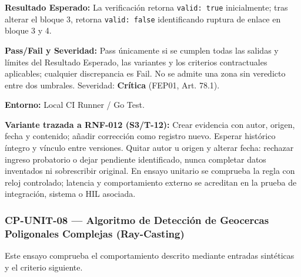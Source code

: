 \par\noindent\textbf{Resultado Esperado:} La verificación retorna \texttt{v\allowbreak{}a\allowbreak{}l\allowbreak{}i\allowbreak{}d\allowbreak{}:\allowbreak{} t\allowbreak{}r\allowbreak{}u\allowbreak{}e\allowbreak{}} inicialmente; tras alterar el bloque 3, retorna \texttt{v\allowbreak{}a\allowbreak{}l\allowbreak{}i\allowbreak{}d\allowbreak{}:\allowbreak{} f\allowbreak{}a\allowbreak{}l\allowbreak{}s\allowbreak{}e\allowbreak{}} identificando ruptura de enlace en bloque 3 y 4.\par
\par\noindent\textbf{Pass/Fail y Severidad:} Pass únicamente si se cumplen todas las salidas y límites del Resultado Esperado, las variantes y los criterios contractuales aplicables; cualquier discrepancia es Fail. No se admite una zona sin veredicto entre dos umbrales. Severidad: \textbf{Crítica} (FEP01, Art. 78.1).\par
\par\noindent\textbf{Entorno:} Local CI Runner / Go Test.\par







\par\noindent\textbf{Variante trazada a RNF-012 (S3/T-12):} Crear evidencia con autor, origen, fecha y contenido; añadir corrección como registro nuevo. Esperar histórico íntegro y vínculo entre versiones. Quitar autor u origen y alterar fecha: rechazar ingreso probatorio o dejar pendiente identificado, nunca completar datos inventados ni sobrescribir original. En ensayo unitario se comprueba la regla con reloj controlado; latencia y comportamiento externo se acreditan en la prueba de integración, sistema o HIL asociada.\par
\subsubsection*{CP-UNIT-08 — Algoritmo de Detección de Geocercas Poligonales Complejas (Ray-Casting)}\label{sec:9-cp-unit-08}
Este ensayo comprueba el comportamiento descrito mediante entradas sintéticas y el criterio siguiente.

